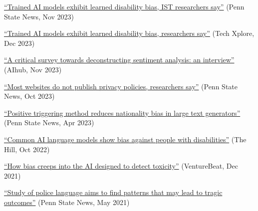 {\begin{cvitems}
  \item {\href{https://www.psu.edu/news/information-sciences-and-technology/story/trained-ai-models-exhibit-learned-disability-bias-ist}{“Trained AI models exhibit learned disability bias, IST researchers say”} (Penn State News, Nov 2023)}
  \item {\href{https://techxplore.com/news/2023-12-ai-disability-bias.html}{“Trained AI models exhibit learned disability bias, researchers say”} (Tech Xplore, Dec 2023)}
  \item {\href{https://aihub.org/2023/11/02/a-critical-survey-towards-deconstructing-sentiment-analysis-interview-with-pranav-venkit-and-mukund-srinath/}{“A critical survey towards deconstructing sentiment analysis: an interview”} (AIhub, Nov 2023)}
  \item {\href{https://www.psu.edu/news/information-sciences-and-technology/story/most-websites-do-not-publish-privacy-policies-researchers}{“Most websites do not publish privacy policies, researchers say”} (Penn State News, Oct 2023)}
  \item {\href{https://www.psu.edu/news/research/story/positive-triggering-method-reduces-nationality-bias-large-text-generators}{“Positive triggering method reduces nationality bias in large text generators”} (Penn State News, Apr 2023)}
  \item {\href{https://thehill.com/changing-america/respect/diversity-inclusion/3688507-common-ai-language-models-show-bias-against-people-with-disabilities-study/}{“Common AI language models show bias against people with disabilities”} (The Hill, Oct 2022)}
  \item {\href{https://venturebeat.com/uncategorized/how-bias-creeps-into-the-ai-designed-to-detect-toxicity/}{“How bias creeps into the AI designed to detect toxicity”} (VentureBeat, Dec 2021)}
  \item {\href{https://www.psu.edu/news/research/story/study-police-language-aims-find-patterns-may-lead-tragic-outcomes}{“Study of police language aims to find patterns that may lead to tragic outcomes”} (Penn State News, May 2021)}
\end{cvitems}
}
